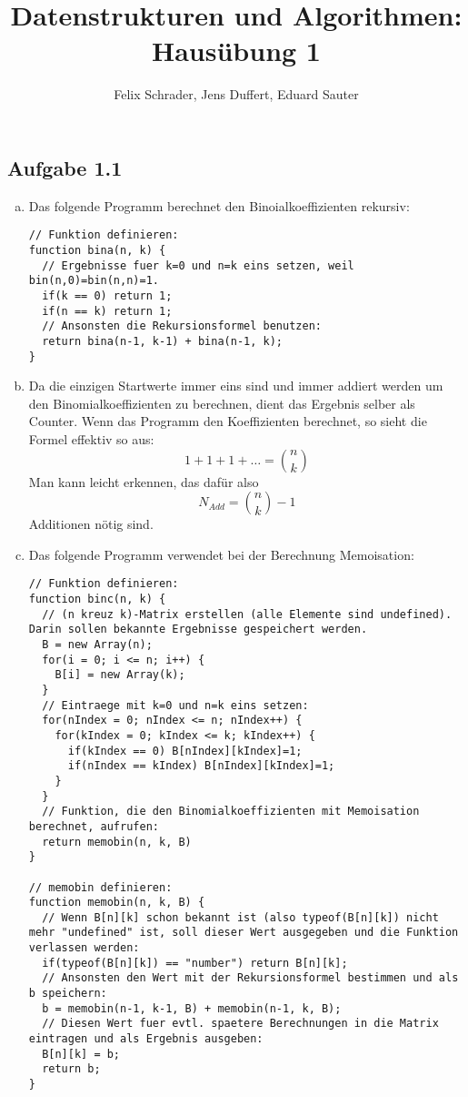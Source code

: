 \documentclass[11pt]{article}
\author{Felix Schrader, Jens Duffert, Eduard Sauter}
\title{Datenstrukturen und Algorithmen: Haus\"ubung 1}
\begin{document}
\maketitle

\subsection*{Aufgabe 1.1}
\begin{enumerate}[a)]

\item Das folgende Programm berechnet den Binoialkoeffizienten rekursiv:

\begin{lstlisting}
// Funktion definieren:
function bina(n, k) {
  // Ergebnisse fuer k=0 und n=k eins setzen, weil bin(n,0)=bin(n,n)=1.
  if(k == 0) return 1;
  if(n == k) return 1;
  // Ansonsten die Rekursionsformel benutzen:
  return bina(n-1, k-1) + bina(n-1, k);
}
\end{lstlisting}

\item Da die einzigen Startwerte immer eins sind und immer addiert werden um den Binomialkoeffizienten zu berechnen, dient das Ergebnis selber als Counter. Wenn das Programm den Koeffizienten berechnet, so sieht die Formel effektiv so aus:\[ 1+1+1+\dots =\binom{n}{k} \]
Man kann leicht erkennen, das daf\"ur also
\begin{equation}
N_{Add}=\binom{n}{k}-1
\end{equation}
Additionen n\"otig sind.

\item Das folgende Programm verwendet bei der Berechnung Memoisation:

\begin{lstlisting}
// Funktion definieren:
function binc(n, k) {
  // (n kreuz k)-Matrix erstellen (alle Elemente sind undefined). Darin sollen bekannte Ergebnisse gespeichert werden.
  B = new Array(n);
  for(i = 0; i <= n; i++) {
    B[i] = new Array(k);
  }
  // Eintraege mit k=0 und n=k eins setzen:
  for(nIndex = 0; nIndex <= n; nIndex++) {
    for(kIndex = 0; kIndex <= k; kIndex++) {
      if(kIndex == 0) B[nIndex][kIndex]=1;
      if(nIndex == kIndex) B[nIndex][kIndex]=1;
    }
  }
  // Funktion, die den Binomialkoeffizienten mit Memoisation berechnet, aufrufen:
  return memobin(n, k, B)
}

// memobin definieren:
function memobin(n, k, B) {
  // Wenn B[n][k] schon bekannt ist (also typeof(B[n][k]) nicht mehr "undefined" ist, soll dieser Wert ausgegeben und die Funktion verlassen werden:
  if(typeof(B[n][k]) == "number") return B[n][k];
  // Ansonsten den Wert mit der Rekursionsformel bestimmen und als b speichern:
  b = memobin(n-1, k-1, B) + memobin(n-1, k, B);
  // Diesen Wert fuer evtl. spaetere Berechnungen in die Matrix eintragen und als Ergebnis ausgeben:
  B[n][k] = b;
  return b;
}
\end{lstlisting}

\end{enumerate}
\end{document}
